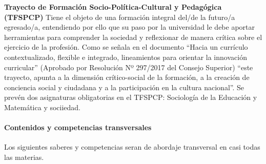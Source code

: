 \documentclass[a4paper, 12pt]{article}
\begin{document}
\begin{description}
\item{\textbf{Trayecto de Formación Socio-Política-Cultural y Pedagógica (TFSPCP)}}  Tiene el objeto de una formación integral del/de la futuro/a egresado/a,  entendiendo por ello que su paso por la universidad le debe aportar herramientas para comprender la sociedad y reflexionar de manera crítica sobre el ejercicio de la profesión. Como se señala en el documento  ``Hacia un currículo contextualizado, 
flexible e integrado, lineamientos para orientar la innovación curricular'' (Aprobado por Resolución Nº 297/2017 del Consejo Superior) ``este trayecto, apunta a la dimensión crítico-social de la formación, a la creación de conciencia social y ciudadana y a la participación en la cultura nacional''. Se prevén dos asignaturas obligatorias en el   TFSPCP:  Sociología de la Educación y Matemática y sociiedad.







\end{description}



\paragraph{Contenidos y competencias transversales}

Los siguientes  saberes y competencias seran de abordaje transversal en casi todas las materias. 
\end{document}
